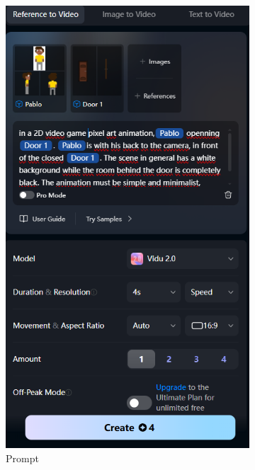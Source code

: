 \begin{figure}[htbp]
    \centering
    \caption{\small Processo da utilização 8 do Vidu em agosto/2025}
    \label{fig:vidu13}
    \begin{subfigure}{0.42\linewidth}
        \includegraphics[width=1\linewidth]{figs/vidu/tela13.PNG}
        \caption{\small Prompt}
        \label{fig:vidu13a}
    \end{subfigure}
    \begin{subfigure}{0.52\linewidth}

\end{subfigure}
\end{figure}
